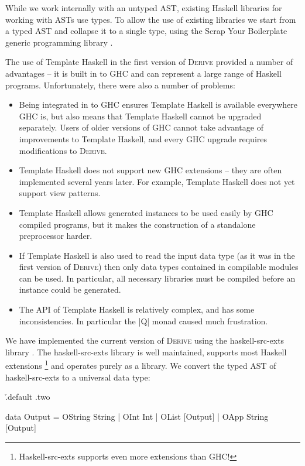 \documentclass{llncs}
\newcommand{\derive}{\textsc{Derive}}
\begin{document}
While we work internally with an untyped AST, existing Haskell libraries for working with ASTs use types. To allow the use of existing libraries we start from a typed AST and collapse it to a single type, using the Scrap Your Boilerplate generic programming library \cite{lammel:syb,lammel:syb2}.

The use of Template Haskell in the first version of \derive{} provided a number of advantages -- it is built in to GHC and can represent a large range of Haskell programs. Unfortunately, there were also a number of problems:

\begin{itemize}
\item Being integrated in to GHC ensures Template Haskell is available everywhere GHC is, but also means that Template Haskell cannot be upgraded separately. Users of older versions of GHC cannot take advantage of improvements to Template Haskell, and every GHC upgrade requires modifications to \derive{}.
\item Template Haskell does not support new GHC extensions -- they are often implemented several years later. For example, Template Haskell does not yet support view patterns.
\item Template Haskell allows generated instances to be used easily by GHC compiled programs, but it makes the construction of a standalone preprocessor harder.
\item If Template Haskell is also used to read the input data type (as it was in the first version of \derive{}) then only data types contained in compilable modules can be used. In particular, all necessary libraries must be compiled before an instance could be generated.
\item The API of Template Haskell is relatively complex, and has some inconsistencies. In particular the |Q| monad caused much frustration.
\end{itemize}

We have implemented the current version of \derive{} using the haskell-src-exts library \cite{haskell_src_exts}. The haskell-src-exts library is well maintained, supports most Haskell extensions \footnote{Haskell-src-exts supports even more extensions than GHC!} and operates purely as a library. We convert the typed AST of haskell-src-exts to a universal data type:

\h{.default .two}\begin{code}
data Output  =  OString String
             |  OInt Int
             |  OList [Output]
             |  OApp String [Output]
\end{code}
\end{document}
